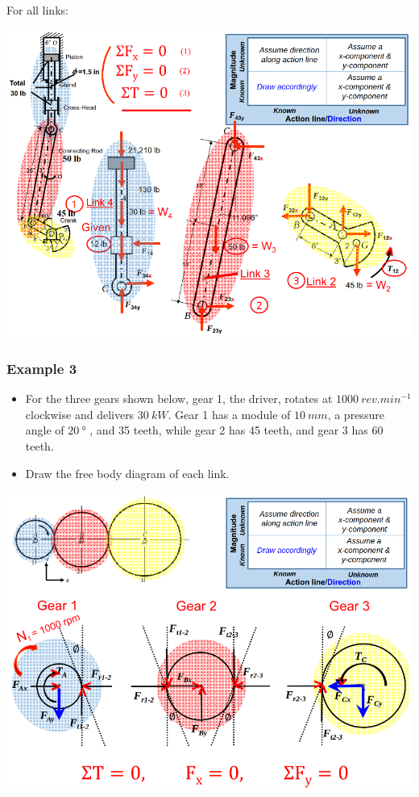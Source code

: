 \documentclass[11pt]{article}
\begin{document}
For all links:
\begin{center}
\includegraphics[width=.9\linewidth]{./images/example-2-all-links-free-body-diagram.png}
\end{center}

 \newpage
\subsubsection{Example 3}
\label{sec:org9054f4c}
\begin{itemize}
\item For the three gears shown below, gear 1, the driver, rotates at \(\qty{1000}{rev.min^{-1}}\) clockwise and delivers \(\qty{30}{kW}\). Gear 1 has a module of \(\qty{10}{mm}\), a pressure angle of \(\qty{20}{\degree}\) , and 35 teeth, while gear 2 has 45 teeth, and gear 3 has 60 teeth.
\item Draw the free body diagram of each link.
\end{itemize}

\begin{center}
\includegraphics[width=.9\linewidth]{./images/example-3-free-body-diagram.png}
\end{center}
\end{document}
